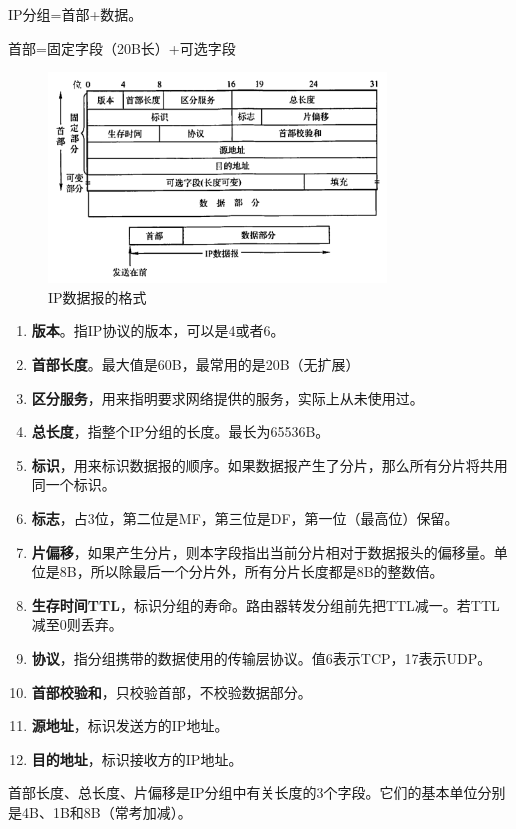 \documentclass[12pt, a4paper, oneside]{ctexart}
\begin{document}
IP分组=首部+数据。

首部=固定字段（20B长）+可选字段

\begin{figure}
    \centering
    \includegraphics[width=0.8\textwidth]{./images/ip_datagram.png}
    \caption{IP数据报的格式}
\end{figure}

\begin{enumerate}
    \item {\bf 版本}。指IP协议的版本，可以是4或者6。
    \item {\bf 首部长度}。最大值是60B，最常用的是20B（无扩展）
    \item {\bf 区分服务}，用来指明要求网络提供的服务，实际上从未使用过。
    \item {\bf 总长度}，指整个IP分组的长度。最长为65536B。
    \item {\bf 标识}，用来标识数据报的顺序。如果数据报产生了分片，那么所有分片将共用同一个标识。
    \item {\bf 标志}，占3位，第二位是MF，第三位是DF，第一位（最高位）保留。
    \item {\bf 片偏移}，如果产生分片，则本字段指出当前分片相对于数据报头的偏移量。单位是8B，所以除最后一个分片外，所有分片长度都是8B的整数倍。
    \item {\bf 生存时间TTL}，标识分组的寿命。路由器转发分组前先把TTL减一。若TTL减至0则丢弃。
    \item {\bf 协议}，指分组携带的数据使用的传输层协议。值6表示TCP，17表示UDP。
    \item {\bf 首部校验和}，只校验首部，不校验数据部分。
    \item {\bf 源地址}，标识发送方的IP地址。
    \item {\bf 目的地址}，标识接收方的IP地址。
\end{enumerate}

首部长度、总长度、片偏移是IP分组中有关长度的3个字段。它们的基本单位分别是4B、1B和8B（常考加减）。
\end{document}
